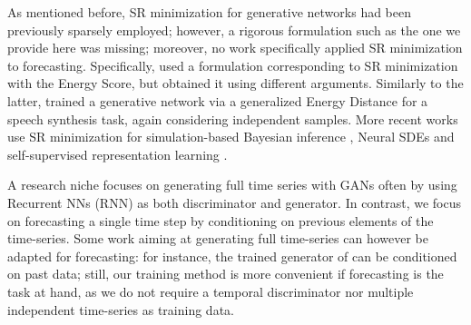 \documentclass[twoside,11pt]{article}
\begin{document}
	As mentioned before, SR minimization for generative networks had been previously sparsely employed; however, a rigorous formulation such as the one we provide here was missing; moreover, no work specifically applied SR minimization to forecasting. Specifically, \cite{bouchacourt2016disco} used a formulation corresponding to SR minimization with the Energy Score, but obtained it using different arguments. Similarly to the latter, \cite{gritsenko2020spectral} trained a generative network via a generalized Energy Distance for a speech synthesis task, again considering independent samples. 
	More recent works use SR minimization for simulation-based Bayesian inference \citep{pacchiardi2022likelihood}, Neural SDEs \citep{issa2023non} and self-supervised representation learning \citep{vahidi2023probabilistic}.
	
	
	
	A research niche focuses on generating full time series with GANs \citep{brophy2021generative} often by using Recurrent NNs (RNN) as both discriminator and generator.
	In contrast, we focus on forecasting a single time step by conditioning on previous elements of the time-series. Some work aiming at generating full time-series can however be adapted for forecasting: for instance, the trained generator of \cite{yoon2019} can be conditioned on past data; still, our training method is more convenient if forecasting is the task at hand, as we do not require a temporal discriminator nor multiple independent time-series as training data.
	
\end{document}
